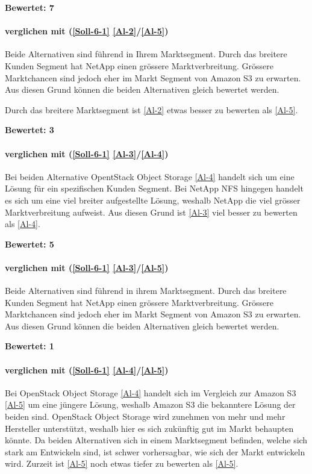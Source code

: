 \textbf{Bewertet: 7}

\paragraph*{  verglichen mit  (\ref{Soll-6-1} \ref{Al-2}/\ref{Al-5})}
Beide Alternativen sind führend in Ihrem Marktsegment. Durch das breitere Kunden Segment hat NetApp einen grössere Marktverbreitung. Grössere Marktchancen sind jedoch eher im Markt Segment von Amazon S3 zu erwarten. Aus diesen Grund können die beiden Alternativen gleich bewertet werden.

Durch das breitere Marktsegment ist  \ref{Al-2} etwas besser zu bewerten als  \ref{Al-5}.

\textbf{Bewertet: 3}

\paragraph*{  verglichen mit  (\ref{Soll-6-1} \ref{Al-3}/\ref{Al-4})}
Bei beiden Alternative OpentStack Object Storage \ref{Al-4} handelt sich um eine Lösung für ein spezifischen Kunden Segment. Bei NetApp NFS hingegen handelt es sich um eine viel breiter aufgestellte Lösung, weshalb NetApp die viel grösser Marktverbreitung aufweist. Aus diesen Grund ist  \ref{Al-3} viel besser zu bewerten als  \ref{Al-4}.

\textbf{Bewertet: 5}

\paragraph*{  verglichen mit  (\ref{Soll-6-1} \ref{Al-3}/\ref{Al-5})}
Beide Alternativen sind führend in ihrem Marktsegment. Durch das breitere Kunden Segment hat NetApp einen grössere Marktverbreitung. Grössere Marktchancen sind jedoch eher im Markt Segment von Amazon S3 zu erwarten. Aus diesen Grund können die beiden Alternativen gleich bewertet werden.

\textbf{Bewertet: 1}


\paragraph*{  verglichen mit  (\ref{Soll-6-1} \ref{Al-4}/\ref{Al-5})}
Bei OpenStack Object Storage \ref{Al-4} handelt sich im Vergleich zur Amazon S3 \ref{Al-5} um eine jüngere Lösung, weshalb Amazon S3 die bekanntere Lösung der beiden sind. OpenStack Object Storage wird zunehmen von mehr und mehr Hersteller unterstützt, weshalb hier es sich zukünftig gut im Markt behaupten könnte. Da beiden Alternativen sich in einem Marktsegment befinden, welche sich stark am Entwickeln sind, ist schwer vorhersagbar, wie sich der Markt entwickeln wird. Zurzeit ist \ref{Al-5} noch etwas tiefer zu bewerten als \ref{Al-5}.

